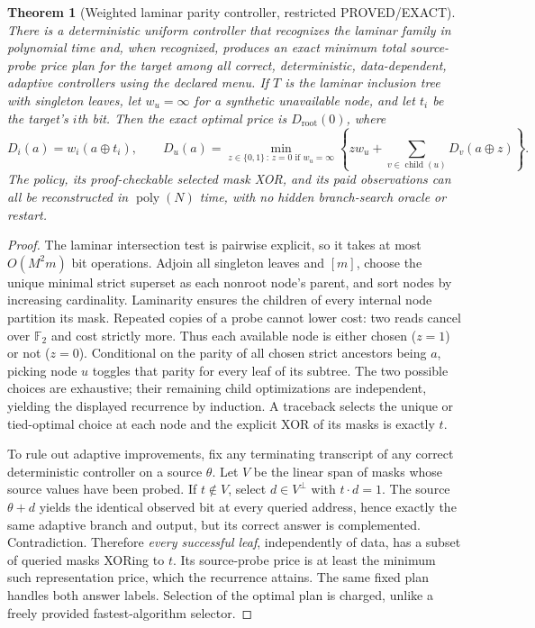 \documentclass[11pt]{article}
\newtheorem{theorem}{Theorem}
\begin{document}
\begin{theorem}[Weighted laminar parity controller, restricted PROVED/EXACT]\label{th:laminar}
There is a deterministic uniform controller that recognizes the laminar family in polynomial time and, when recognized, produces an \emph{exact minimum total source-probe price} plan for the target among \emph{all} correct, deterministic, data-dependent, adaptive controllers using the declared menu. If $T$ is the laminar inclusion tree with singleton leaves, let $w_u=\infty$ for a synthetic unavailable node, and let $t_i$ be the target's $i$th bit. Then the exact optimal price is $D_{\mathrm{root}}(0)$, where
\[
D_i(a)=w_i(a\oplus t_i),\qquad
D_u(a)=\min_{z\in\{0,1\}\, :\, z=0\text{ if }w_u=\infty}
\left\{z w_u+\sum_{v\in\operatorname{child}(u)}D_v(a\oplus z)\right\}.
\]
The policy, its proof-checkable selected mask XOR, and its paid observations can all be reconstructed in $\operatorname{poly}(N)$ time, with no hidden branch-search oracle or restart.
\end{theorem}
\begin{proof}
The laminar intersection test is pairwise explicit, so it takes at most $O(M^2m)$ bit operations. Adjoin all singleton leaves and $[m]$, choose the unique minimal strict superset as each nonroot node's parent, and sort nodes by increasing cardinality. Laminarity ensures the children of every internal node partition its mask. Repeated copies of a probe cannot lower cost: two reads cancel over $\mathbb F_2$ and cost strictly more. Thus each available node is either chosen ($z=1$) or not ($z=0$). Conditional on the parity of all chosen strict ancestors being $a$, picking node $u$ toggles that parity for every leaf of its subtree. The two possible choices are exhaustive; their remaining child optimizations are independent, yielding the displayed recurrence by induction. A traceback selects the unique or tied-optimal choice at each node and the explicit XOR of its masks is exactly $t$.

To rule out adaptive improvements, fix any terminating transcript of any correct deterministic controller on a source $\theta$. Let $V$ be the linear span of masks whose source values have been probed. If $t\notin V$, select $d\in V^\perp$ with $t\cdot d=1$. The source $\theta+d$ yields the identical observed bit at every queried address, hence exactly the same adaptive branch and output, but its correct answer is complemented. Contradiction. Therefore \emph{every successful leaf}, independently of data, has a subset of queried masks XORing to $t$. Its source-probe price is at least the minimum such representation price, which the recurrence attains. The same fixed plan handles both answer labels. Selection of the optimal plan is charged, unlike a freely provided fastest-algorithm selector.
\end{proof}
\end{document}
